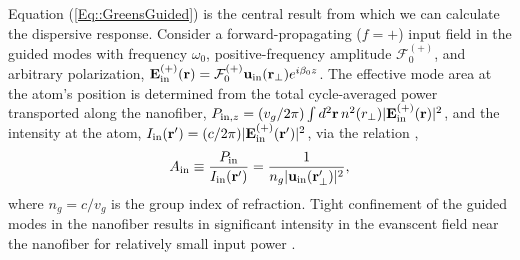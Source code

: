 \documentclass[aps,pra,twocolumn]{revtex4-1} %
\newcommand{\inp}{{\rm in}}
\newcommand{\Eamp}{\mathcal{F}_0^{(+)}}
\begin{document}
Equation (\ref{Eq::GreensGuided}) is the central result from which we can calculate the dispersive response.  Consider a forward-propagating ($f=+$) input field in the guided modes with frequency $\omega_0$, positive-frequency amplitude $\Eamp$, and arbitrary polarization, $\mathbf{E}^{(+)}_{\inp}(\br) = \Eamp  \mathbf{u}_{\rm in}(\br_\perp) e^{i \beta_0 z}$.   
The effective mode area at the atom's position is determined from the total cycle-averaged power transported along the nanofiber, $P_{{\rm in},z} = (v_g/2\pi) \int d^2\br \, n^2(r_\perp) |\mathbf{E}^{(+)}_{\inp}(\br) |^2$, and the intensity at the atom, $I_{\rm in}(\mathbf{r}') = (c/2\pi) |\mathbf{E}^{(+)}_{\inp}(\br') |^2$, via the relation \cite{domokos_quantum_2002},
 	\begin{align} \label{Eq::AreaIn}
 		A_{\rm in} \equiv \frac{P_{{\rm in}}}{I_{\rm in}(\mathbf{r}')} = \frac{1}{n_g |\mathbf{u}_{\rm in}(\mathbf{r}'_\perp)|^{2}},
	\end{align}
where $n_g = c/v_g$ is the group index of refraction.  
Tight confinement of the guided modes in the nanofiber results in significant intensity in the evanscent field near the nanofiber for relatively small input power \cite{bures_power_1999}.  
\end{document}
